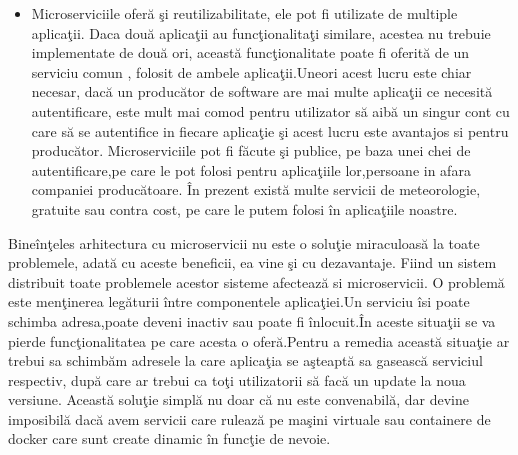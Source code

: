 \documentclass[a4paper,12pt]{report}
\begin{document}
\begin{itemize}
	      a \^intregului nostru sistem, este constr\^ans\u a \^in performan\c t\u a, dar dac\u a
	      acest comportament este blocat \^intr-o aplica\c tie monolitic\u a gigant\u a, trebuie sa scal\u am totul \^impreun\u a
	      ca o bucat\u a \footcite{buildingMicroservices5}.Acest lucru se face de obicei folosind mai multe servere
	      \c si un server de tip load balancer care s\u a distribuie cererile c\u atre unul din acele servere pentru
	      a reduce munca depus\u a de un singur server o depune, astfel evit\^and supra\^incarcarea si cresc\^and performan\c ta.
	      \^In cazul arhitecturii cu microservicii, ajunge s\u a scalam doar acele servicii care au probleme de performan\c ta.
	\item Microserviciile ofer\u a \c si reutilizabilitate, ele pot fi utilizate de multiple aplica\c tii.
		  Daca dou\u a aplica\c tii au func\c tionalita\c ti similare, acestea nu trebuie implementate de dou\u a ori, aceast\u a func\c tionalitate
		  poate fi oferit\u a de un serviciu comun , folosit de ambele aplica\c tii.Uneori acest lucru este chiar necesar, dac\u a un produc\u ator de software
		  are mai multe aplica\c tii ce necesit\u a autentificare, este mult mai comod pentru utilizator s\u a aib\u a un singur cont cu care s\u a se autentifice in fiecare aplica\c tie 
		  \c si acest lucru este avantajos si pentru produc\u ator.
		  Microserviciile pot fi f\u acute \c si publice, pe baza unei chei de autentificare,pe care le pot folosi pentru aplica\c tiile lor,persoane in afara companiei produc\u atoare.
		  \^In prezent exist\u a multe servicii de meteorologie, gratuite sau contra cost, pe care le putem folosi \^in aplica\c tiile noastre.
\end{itemize}

Bine\^in\c teles arhitectura cu microservicii nu este o solu\c tie miraculoas\u a la toate problemele,
adat\u a cu aceste beneficii, ea vine \c si cu dezavantaje. Fiind un sistem distribuit toate
problemele acestor sisteme afecteaz\u a si microservicii.
O problem\u a este men\c tinerea leg\u aturii \^intre componentele aplica\c tiei.Un serviciu \^isi poate schimba 
adresa,poate deveni inactiv sau poate fi \^inlocuit.\^In aceste situa\c tii se va pierde func\c tionalitatea pe care acesta o 
ofer\u a.Pentru a remedia aceast\u a situa\c tie ar trebui sa schimb\u am adresele la care aplica\c tia se a\c steapt\u a sa 
gaseasc\u a serviciul respectiv, dup\u a care ar trebui ca to\c ti utilizatorii s\u a fac\u a un update la noua versiune.
Aceast\u a solu\c tie simpl\u a nu doar c\u a nu este convenabil\u a, dar devine imposibil\u a dac\u a avem servicii care ruleaz\u a 
pe ma\c sini virtuale sau containere de docker care sunt create dinamic \^in func\c tie de nevoie.
\end{document}
